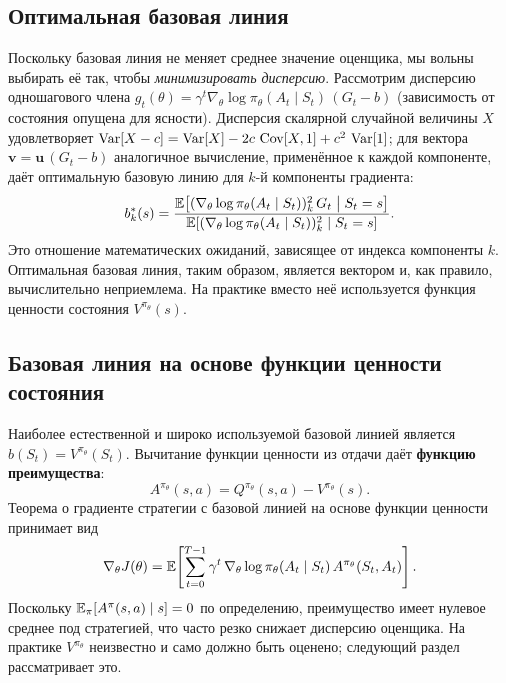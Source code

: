 \subsection{Оптимальная базовая линия}

Поскольку базовая линия не меняет среднее значение оценщика, мы вольны выбирать её так, чтобы \emph{минимизировать дисперсию}. Рассмотрим дисперсию одношагового члена $g_t(\theta) = \gamma^t \nabla_\theta \log \pi_\theta(A_t \mid S_t)\, (G_t - b)$ (зависимость от состояния опущена для ясности). Дисперсия скалярной случайной величины $X$ удовлетворяет $\operatorname{Var}[X - c] = \operatorname{Var}[X] - 2c\, \operatorname{Cov}[X, 1] + c^2\, \operatorname{Var}[1]$; для вектора $\mathbf{v} = \mathbf{u}\,(G_t - b)$ аналогичное вычисление, применённое к каждой компоненте, даёт оптимальную базовую линию для $k$-й компоненты градиента:
\begin{equation}
\label{eq:optimal-baseline}
b^*_k(s) = \frac{\operatorname{\mathbb{E}}\!\left[(\nabla_\theta \log \pi_\theta(A_t \mid S_t))^2_k\, G_t \;\middle|\; S_t = s\right]}{\operatorname{\mathbb{E}}\!\left[(\nabla_\theta \log \pi_\theta(A_t \mid S_t))^2_k \;\middle|\; S_t = s\right]}.
\end{equation}
Это отношение математических ожиданий, зависящее от индекса компоненты $k$. Оптимальная базовая линия, таким образом, является вектором и, как правило, вычислительно неприемлема. На практике вместо неё используется функция ценности состояния $V^{\pi_\theta}(s)$.

\subsection{Базовая линия на основе функции ценности состояния}

Наиболее естественной и широко используемой базовой линией является $b(S_t) = V^{\pi_\theta}(S_t)$. Вычитание функции ценности из отдачи даёт \textbf{функцию преимущества}:
\begin{equation}
\label{eq:advantage-ch8}
A^{\pi_\theta}(s,a) = Q^{\pi_\theta}(s,a) - V^{\pi_\theta}(s).
\end{equation}
Теорема о градиенте стратегии с базовой линией на основе функции ценности принимает вид
\begin{equation}
\label{eq:pg-advantage}
\nabla_\theta J(\theta)
= \operatorname{\mathbb{E}}\!\left[\sum_{t=0}^{T-1} \gamma^t\, \nabla_\theta \log \pi_\theta(A_t \mid S_t)\, A^{\pi_\theta}(S_t, A_t)\right].
\end{equation}
Поскольку $\operatorname{\mathbb{E}}_\pi[A^{\pi}(s,a) \mid s] = 0$ по определению, преимущество имеет нулевое среднее под стратегией, что часто резко снижает дисперсию оценщика. На практике $V^{\pi_\theta}$ неизвестно и само должно быть оценено; следующий раздел рассматривает это.


